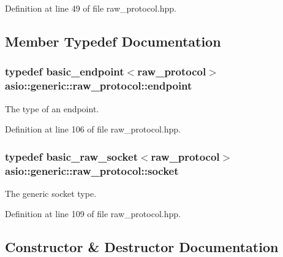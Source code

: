 Definition at line 49 of file raw\+\_\+protocol.\+hpp.



\subsection{Member Typedef Documentation}
\hypertarget{classasio_1_1generic_1_1raw__protocol_acf929033057209f9611472f4f23fd843}{}
\subsubsection[{endpoint}]{\setlength{\rightskip}{0pt plus 5cm}typedef {\bf basic\+\_\+endpoint}$<${\bf raw\+\_\+protocol}$>$ {\bf asio\+::generic\+::raw\+\_\+protocol\+::endpoint}}\label{classasio_1_1generic_1_1raw__protocol_acf929033057209f9611472f4f23fd843}


The type of an endpoint. 



Definition at line 106 of file raw\+\_\+protocol.\+hpp.

\hypertarget{classasio_1_1generic_1_1raw__protocol_a9b6f99280e2965256061041b5bf465c6}{}
\subsubsection[{socket}]{\setlength{\rightskip}{0pt plus 5cm}typedef {\bf basic\+\_\+raw\+\_\+socket}$<${\bf raw\+\_\+protocol}$>$ {\bf asio\+::generic\+::raw\+\_\+protocol\+::socket}}\label{classasio_1_1generic_1_1raw__protocol_a9b6f99280e2965256061041b5bf465c6}


The generic socket type. 



Definition at line 109 of file raw\+\_\+protocol.\+hpp.



\subsection{Constructor \& Destructor Documentation}
\hypertarget{classasio_1_1generic_1_1raw__protocol_ac579d774e2ae8a6bb023182498d9b916}{}
